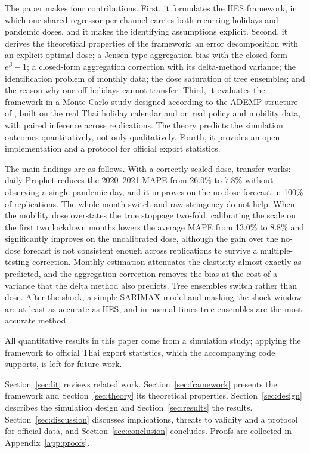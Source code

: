 \documentclass{article}
\theoremstyle{plain}
\theoremstyle{definition}
\theoremstyle{remark}
\begin{document}
The paper makes four contributions. First, it formulates the HES framework, in which one shared regressor per channel carries both recurring holidays and pandemic doses, and it makes the identifying assumptions explicit. Second, it derives the theoretical properties of the framework: an error decomposition with an explicit optimal dose; a Jensen-type aggregation bias with the closed form $e^{\beta}-1$; a closed-form aggregation correction with its delta-method variance; the identification problem of monthly data; the dose saturation of tree ensembles; and the reason why one-off holidays cannot transfer. Third, it evaluates the framework in a Monte Carlo study designed according to the ADEMP structure of \citet{morris2019simulation}, built on the real Thai holiday calendar and on real policy and mobility data, with paired inference across replications. The theory predicts the simulation outcomes quantitatively, not only qualitatively. Fourth, it provides an open implementation and a protocol for official export statistics.

The main findings are as follows. With a correctly scaled dose, transfer works: daily Prophet reduces the 2020--2021 MAPE from 26.0\% to 7.8\% without observing a single pandemic day, and it improves on the no-dose forecast in 100\% of replications. The whole-month switch and raw stringency do not help. When the mobility dose overstates the true stoppage two-fold, calibrating the scale on the first two lockdown months lowers the average MAPE from 13.0\% to 8.8\% and significantly improves on the uncalibrated dose, although the gain over the no-dose forecast is not consistent enough across replications to survive a multiple-testing correction. Monthly estimation attenuates the elasticity almost exactly as predicted, and the aggregation correction removes the bias at the cost of a variance that the delta method also predicts. Tree ensembles switch rather than dose. After the shock, a simple SARIMAX model and masking the shock window are at least as accurate as HES, and in normal times tree ensembles are the most accurate method.

All quantitative results in this paper come from a simulation study; applying the framework to official Thai export statistics, which the accompanying code supports, is left for future work.

Section~\ref{sec:lit} reviews related work. Section~\ref{sec:framework} presents the framework and Section~\ref{sec:theory} its theoretical properties. Section~\ref{sec:design} describes the simulation design and Section~\ref{sec:results} the results. Section~\ref{sec:discussion} discusses implications, threats to validity and a protocol for official data, and Section~\ref{sec:conclusion} concludes. Proofs are collected in Appendix~\ref{app:proofs}.
\end{document}
